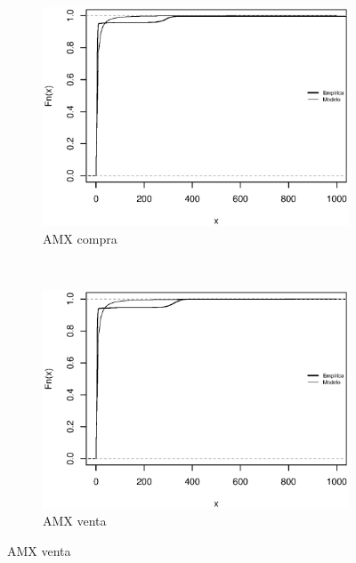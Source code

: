 \documentclass[11pt]{article}
\numberwithin{equation}{section} %
\begin{document}
\begin{figure}[htbp]
\centering
\begin{subfigure}[b]{0.5\textwidth}
\centering
\includegraphics[width=\textwidth, trim=0 0.5cm 0 1cm]{amxcompra.eps}
\caption{AMX compra}
\label{fig:amxcompra}
\end{subfigure}%
~ %
\begin{subfigure}[b]{0.5\textwidth}
\centering
\includegraphics[width=\textwidth, trim=0 0.5cm 0 1cm]{amxventa.eps}
\caption{AMX venta}
\label{fig:amxventa}
\end{subfigure}


\end{figure}
\end{document}
